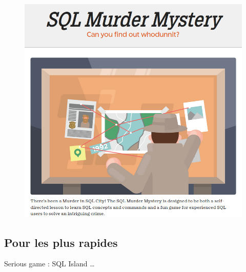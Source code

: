 \documentclass[
  a4paper,
  DIV=11,
  numbers=noendperiod]{scrartcl}
\begin{document}
\begin{figure}

{\centering 

\href{https://mystery.knightlab.com/}{\includegraphics{sql_city.png}}

}

\end{figure}

\hypertarget{fa-desktop-pour-les-plus-rapides}{%
\subsection{\texorpdfstring{ Pour les plus
rapides}{ Pour les plus rapides}}\label{fa-desktop-pour-les-plus-rapides}}

Serious game : SQL Island \ldots{}
\end{document}
